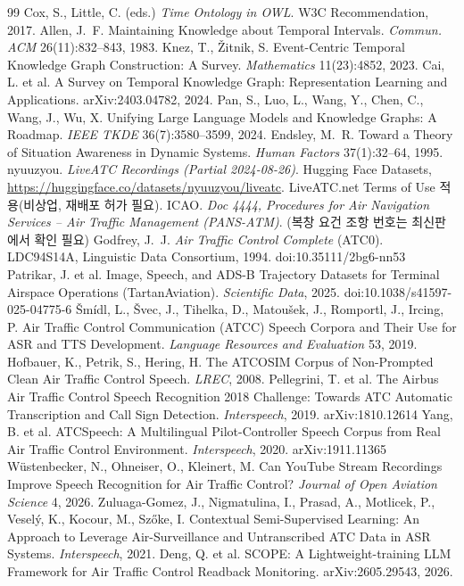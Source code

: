 \documentclass[10pt,a4paper]{article}
\begin{document}
\begin{thebibliography}{99}
 Cox, S., Little, C. (eds.) \emph{Time Ontology in OWL}. W3C Recommendation, 2017.
 Allen, J.~F. Maintaining Knowledge about Temporal Intervals. \emph{Commun. ACM} 26(11):832--843, 1983.
 Knez, T., \v{Z}itnik, S. Event-Centric Temporal Knowledge Graph Construction: A Survey. \emph{Mathematics} 11(23):4852, 2023.
 Cai, L. et al. A Survey on Temporal Knowledge Graph: Representation Learning and Applications. arXiv:2403.04782, 2024.
 Pan, S., Luo, L., Wang, Y., Chen, C., Wang, J., Wu, X. Unifying Large Language Models and Knowledge Graphs: A Roadmap. \emph{IEEE TKDE} 36(7):3580--3599, 2024.
 Endsley, M.~R. Toward a Theory of Situation Awareness in Dynamic Systems. \emph{Human Factors} 37(1):32--64, 1995.
 nyuuzyou. \emph{LiveATC Recordings (Partial 2024-08-26)}. Hugging Face Datasets, \url{https://huggingface.co/datasets/nyuuzyou/liveatc}. LiveATC.net Terms of Use 적용(비상업, 재배포 허가 필요).
 ICAO. \emph{Doc 4444, Procedures for Air Navigation Services -- Air Traffic Management (PANS-ATM)}. (복창 요건 조항 번호는 최신판에서 확인 필요)
 Godfrey, J.~J. \emph{Air Traffic Control Complete} (ATC0). LDC94S14A, Linguistic Data Consortium, 1994. doi:10.35111/2bg6-nn53
 Patrikar, J. et al. Image, Speech, and ADS-B Trajectory Datasets for Terminal Airspace Operations (TartanAviation). \emph{Scientific Data}, 2025. doi:10.1038/s41597-025-04775-6
 \v{S}m\'idl, L., \v{S}vec, J., Tihelka, D., Matou\v{s}ek, J., Romportl, J., Ircing, P. Air Traffic Control Communication (ATCC) Speech Corpora and Their Use for ASR and TTS Development. \emph{Language Resources and Evaluation} 53, 2019.
 Hofbauer, K., Petrik, S., Hering, H. The ATCOSIM Corpus of Non-Prompted Clean Air Traffic Control Speech. \emph{LREC}, 2008.
 Pellegrini, T. et al. The Airbus Air Traffic Control Speech Recognition 2018 Challenge: Towards ATC Automatic Transcription and Call Sign Detection. \emph{Interspeech}, 2019. arXiv:1810.12614
 Yang, B. et al. ATCSpeech: A Multilingual Pilot-Controller Speech Corpus from Real Air Traffic Control Environment. \emph{Interspeech}, 2020. arXiv:1911.11365
 W\"ustenbecker, N., Ohneiser, O., Kleinert, M. Can YouTube Stream Recordings Improve Speech Recognition for Air Traffic Control? \emph{Journal of Open Aviation Science} 4, 2026.
 Zuluaga-Gomez, J., Nigmatulina, I., Prasad, A., Motlicek, P., Vesel\'y, K., Kocour, M., Sz\H{o}ke, I. Contextual Semi-Supervised Learning: An Approach to Leverage Air-Surveillance and Untranscribed ATC Data in ASR Systems. \emph{Interspeech}, 2021.
 Deng, Q. et al. SCOPE: A Lightweight-training LLM Framework for Air Traffic Control Readback Monitoring. arXiv:2605.29543, 2026.
\end{thebibliography}
\end{document}
